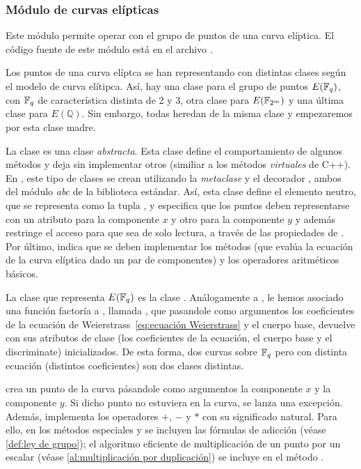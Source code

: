 \subsubsection{Módulo de curvas elípticas}
\label{subs:Módulo de curvas elípticas}

Este módulo permite operar con el grupo de puntos de una curva elíptica. El código fuente de este módulo está en el archivo .

Los puntos de una curva elíptca se han representando con distintas clases según el modelo de curva elítipca. Así, hay una clase para el grupo de puntos $E(\mathbb{F}_q)$, con $\mathbb{F}_q$ de característica distinta de 2 y 3, otra clase para $E(\mathbb{F}_{2^m})$ y una última clase para $E(\mathbb{Q})$. Sin embargo, todas heredan de la misma clase y empezaremos por esta clase madre.

La clase  es una clase \emph{abstracta}. Esta clase define el comportamiento de algunos métodos y deja sin implementar otros (similiar a los métodos \emph{virtuales} de C++). En , este tipo de clases se crean utilizando la \emph{metaclase}  y el decorador , ambos del módulo \emph{abc} de la biblioteca estándar. Así, esta clase define el elemento neutro, que se representa como la tupla , y especifica que los puntos deben representarse con un atributo para la componente $x$ y otro para la componente $y$ y además restringe el acceso para que sea de solo lectura, a través de las propiedades de . Por último, indica que se deben implementar los métodos  (que evalúa la ecuación de la curva elíptica dado un par de componentes) y los operadores aritméticos básicos.

La clase que representa $E(\mathbb{F}_q)$ es la clase . Análogamente a , le hemos asociado una función factoría a , llamada , que pasandole como argumentos los coeficientes de la ecuación de Weierstrass~\ref{eq:ecuación Weierstrass} y el cuerpo base, devuelve  con sus atributos de clase (los coeficientes de la ecuación, el cuerpo base y el discriminate) inicializados. De esta forma, dos curvas sobre $\mathbb{F}_q$ pero con distinta ecuación (distintos coeficientes) son dos clases distintas.

 crea un punto de la curva pásandole como argumentos la componente $x$ y la componente $y$. Si dicho punto no estuviera en la curva, se lanza una excepción. Además,  implementa los operadores $+$, $-$ y $*$ con su significado natural. Para ello, en los métodos especiales  y  se incluyen las fórmulas de adicción (véase \ref{def:ley de grupo}); el algoritmo eficiente de multiplicación de un punto por un escalar (véase \ref{al:multiplicación por duplicación}) se incluye en el método .

